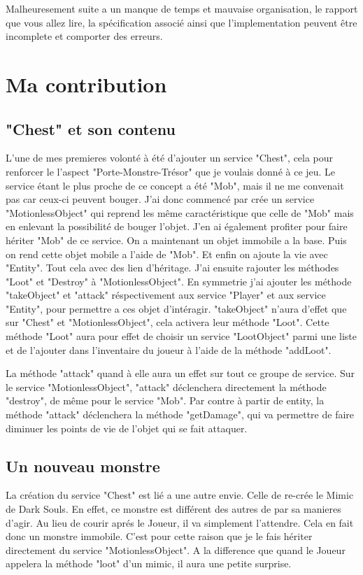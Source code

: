 \documentclass[12pt]{report}
\begin{document}
Malheuresement suite a un manque de temps et mauvaise organisation, le rapport que vous allez lire, la spécification associé ainsi que l'implementation peuvent être incomplete et comporter des erreurs.

\chapter{Ma contribution}

\section{"Chest" et son contenu}

L'une de mes premieres volonté à été d'ajouter un service "Chest", cela pour renforcer le l'aspect "Porte-Monstre-Trésor" que je voulais donné à ce jeu.
Le service étant le plus proche de ce concept a été "Mob", mais il ne me convenait pas car ceux-ci peuvent bouger.
J'ai donc commencé par crée un service "MotionlessObject" qui reprend les même caractéristique que celle de "Mob" mais en enlevant la possibilité de bouger l'objet.
J'en ai également profiter pour faire hériter "Mob" de ce service.
On a maintenant un objet immobile a la base.
Puis on rend cette objet mobile a l'aide de "Mob".
Et enfin on ajoute la vie avec "Entity". Tout cela avec des lien d'héritage.
J'ai ensuite rajouter les méthodes "Loot" et "Destroy" à "MotionlessObject".
En symmetrie j'ai ajouter les méthode "takeObject" et "attack" réspectivement aux service "Player" et aux service "Entity", pour permettre a ces objet d'intéragir.
"takeObject" n'aura d'effet que sur "Chest" et "MotionlessObject", cela activera leur méthode "Loot".
Cette méthode "Loot" aura pour effet de choisir un service "LootObject" parmi une liste et de l'ajouter dans l'inventaire du joueur à l'aide de la méthode "addLoot".

La méthode "attack" quand à elle aura un effet sur tout ce groupe de service.
Sur le service "MotionlessObject", "attack" déclenchera directement la méthode "destroy", de même pour le service "Mob".
Par contre à partir de entity, la méthode "attack" déclenchera la méthode "getDamage", qui va permettre de faire diminuer les points de vie de l'objet qui se fait attaquer.

\section{Un nouveau monstre}

La création du service "Chest" est lié a une autre envie.
Celle de re-crée le Mimic de Dark Souls.
En effet, ce monstre est différent des autres de par sa manieres d'agir.
Au lieu de courir aprés le Joueur, il va simplement l'attendre.
Cela en fait donc un monstre immobile.
C'est pour cette raison que je le fais hériter directement du service "MotionlessObject".
A la difference que quand le Joueur appelera la méthode "loot" d'un mimic, il aura une petite surprise.
\end{document}
